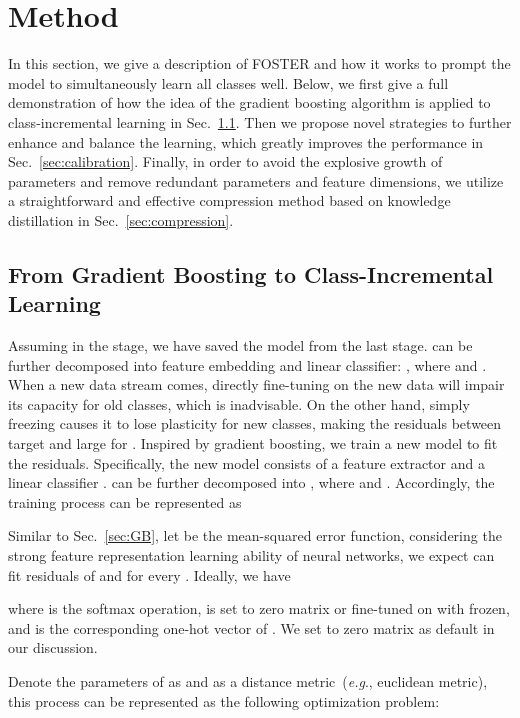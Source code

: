 \documentclass[runningheads]{llncs}
\begin{document}
\section{Method}\label{sec:method}

In this section, we give a description of FOSTER and how it works to prompt the model to simultaneously learn all classes well. Below, we first give a full demonstration of how the idea of the gradient boosting algorithm is applied to class-incremental learning in Sec.~\ref{sec:GB2CIL}.  Then we propose novel strategies to further enhance and balance  the learning, which greatly improves the performance in Sec.~\ref{sec:calibration}. Finally, in order to avoid the explosive growth of parameters and remove redundant parameters and feature dimensions, we utilize a straightforward and effective compression method based on knowledge distillation in Sec.~\ref{sec:compression}.

\subsection{From Gradient Boosting to Class-Incremental Learning}\label{sec:GB2CIL}
Assuming in the  stage, we have saved the model  from the last stage.  can be further decomposed into feature embedding and linear classifier: , where  and . When a new data stream comes,  directly fine-tuning  on the new data will impair its capacity for old classes, which is inadvisable. On the other hand, simply freezing  causes it to lose plasticity for new classes, making the residuals between target  and  large for . Inspired by gradient boosting, we train a new model to fit the residuals. Specifically, the new model  consists of a feature extractor  and a linear classifier .  can be further decomposed into , where  and  . Accordingly, the training process can be represented as 

Similar to Sec.~\ref{sec:GB}, let  be the mean-squared error function, considering the strong feature representation learning ability of neural networks, we expect  can fit residuals of  and  for every . Ideally, we have

where  is the softmax operation,  is set to zero matrix or fine-tuned on  with  frozen, and  is the corresponding one-hot vector of . We set  to  zero  matrix as default in our discussion.

Denote the parameters of   as  and  as a distance metric~(\textit{e.g}., euclidean metric),  this process can be represented as the following optimization problem:
\end{document}
